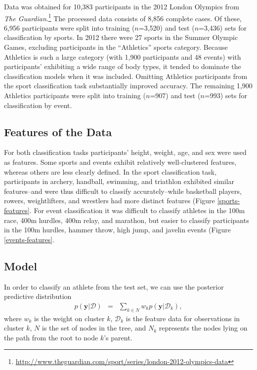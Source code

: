 \documentclass[12pt,letterpaper]{article} %
\begin{document}
Data was obtained for 10,383 participants in the 2012 London Olympics from \textit{The Guardian}.\footnote{\url{http://www.theguardian.com/sport/series/london-2012-olympics-data}} The processed data consists of 8,856 complete cases. Of these, 6,956 participants were split into training ($n$=3,520) and test ($n$=3,436) sets for classification by sports. In 2012 there were 27 sports in the Summer Olympic Games, excluding participants in the ``Athletics'' sports category. Because Athletics is such a large category (with 1,900 participants and 48 events) with participants' exhibiting a wide range of body types, it tended to dominate the classification models when it was included. Omitting Athletics participants from the sport classification task substantially improved accuracy. The remaining 1,900 Athletics participants were split into training ($n$=907) and test ($n$=993) sets for classification by event. 


\subsection{Features of the Data}

For both classification tasks participants' height, weight, age, and sex were used as features. Some sports and events exhibit relatively well-clustered features, whereas others are less clearly defined. In the sport classification task, participants in archery, handball, swimming, and triathlon exhibited similar features--and were thus difficult to classify accurately--while basketball players, rowers, weightlifters, and wrestlers had more distinct features (Figure \ref{sports-features}. For event classification it was difficult to classify athletes in the 100m race, 400m hurdles, 400m relay, and marathon, but easier to classify participants in the 100m hurdles, hammer throw, high jump, and javelin events (Figure \ref{events-features}. 




\subsection{Model}



In order to classify an athlete from the test set, we can use the posterior predictive distribution
\begin{eqnarray*}
p(\mathbf{y}|\mathcal{D}) &=& \sum_{k \in N} w_k p(\mathbf{y}|\mathcal{D}_k),
\end{eqnarray*}
where $w_k$ is the weight on cluster $k$, $\mathcal{D}_k$ is the feature data for observations in cluster $k$, $N$ is the set of nodes in the tree, and $N_k$ represents the nodes lying on the path from the root to node $k$'s parent. 
\end{document}
